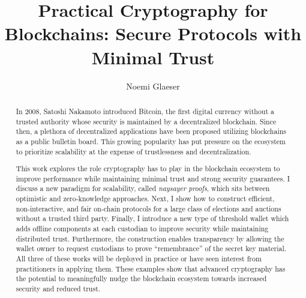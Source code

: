 \documentclass{article}
\title{Practical Cryptography for Blockchains: Secure Protocols with Minimal Trust}
\author{Noemi Glaeser}
\date{}
\newcommand{\noemi}[1]{\textcolor{magenta}{Noemi: #1}}
\begin{document}
\maketitle
\begin{abstract}
In 2008, Satoshi Nakamoto introduced Bitcoin, the first digital currency without a trusted authority whose security is maintained by a decentralized blockchain. Since then, a plethora of decentralized applications have been proposed utilizing blockchains as a public bulletin board. This growing popularity has put pressure on the ecosystem to prioritize scalability at the expense of trustlessness and decentralization.

This work explores the role cryptography has to play in the blockchain ecosystem to improve performance while maintaining minimal trust and strong security guarantees. 
I discuss a new paradigm for scalability, called \emph{naysayer proofs}, which sits between optimistic and zero-knowledge approaches.
Next, I show how to construct efficient, non-interactive, and fair on-chain protocols for a large class of elections and auctions without a trusted third party. 
Finally, I introduce a new type of threshold wallet which adds offline components at each custodian to improve security while maintaining distributed trust. Furthermore, the construction enables transparency by allowing the wallet owner to request custodians to prove ``remembrance'' of the secret key material.
All three of these works will be deployed in practice or have seen interest from practitioners in applying them. These examples show that advanced cryptography has the potential to meaningfully nudge the blockchain ecosystem towards increased security and reduced trust.

\end{abstract}
\end{document}
